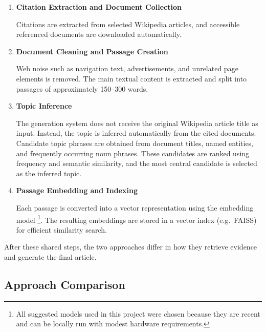 \documentclass[10pt,a4paper]{article}
\begin{document}
\begin{enumerate}
    \item \textbf{Citation Extraction and Document Collection}

    Citations are extracted from selected Wikipedia articles, and accessible referenced documents are downloaded automatically.

    \item \textbf{Document Cleaning and Passage Creation}

    Web noise such as navigation text, advertisements, and unrelated page elements is removed. The main textual content is extracted and split into passages of approximately 150--300 words.

    \item \textbf{Topic Inference}

    The generation system does not receive the original Wikipedia article title as input. Instead, the topic is inferred automatically from the cited documents. Candidate topic phrases are obtained from document titles, named entities, and frequently occurring noun phrases. These candidates are ranked using frequency and semantic similarity, and the most central candidate is selected as the inferred topic.

    \item \textbf{Passage Embedding and Indexing}

    Each passage is converted into a vector representation using the embedding model
    \href{https://huggingface.co/sentence-transformers/all-MiniLM-L6-v2}{\texttt{}}\footnote{\label{ftnt:models}All suggested models used in this project were chosen because they are recent and can be locally run with modest hardware requirements.}. The resulting embeddings are stored in a vector index (e.g.\ FAISS) for efficient similarity search.
\end{enumerate}

After these shared steps, the two approaches differ in how they retrieve evidence and generate the final article.

\subsection*{Approach Comparison}
\end{document}
